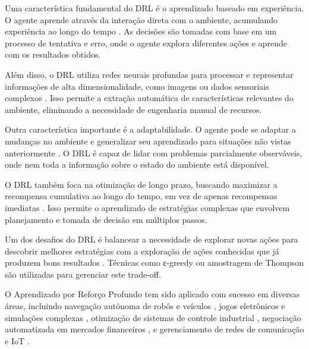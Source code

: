 Uma característica fundamental do DRL é o aprendizado baseado em experiência. O agente aprende através da interação direta com o ambiente, acumulando experiência ao longo do tempo \cite{https://www.semanticscholar.org/paper/8efe27f4a31ebb72e9b3047107a4fe940259aad9}. As decisões são tomadas com base em um processo de tentativa e erro, onde o agente explora diferentes ações e aprende com os resultados obtidos.

Além disso, o DRL utiliza redes neurais profundas para processar e representar informações de alta dimensionalidade, como imagens ou dados sensoriais complexos \cite{https://www.semanticscholar.org/paper/8efe27f4a31ebb72e9b3047107a4fe940259aad9,https://www.semanticscholar.org/paper/3340124e85d6e5fbc08db49ad3e6a8d9ffa04222}. Isso permite a extração automática de características relevantes do ambiente, eliminando a necessidade de engenharia manual de recursos.

Outra característica importante é a adaptabilidade. O agente pode se adaptar a mudanças no ambiente e generalizar seu aprendizado para situações não vistas anteriormente \cite{https://www.semanticscholar.org/paper/27c834620d2c6adb51dffc4be9907e185907ce12}. O DRL é capaz de lidar com problemas parcialmente observáveis, onde nem toda a informação sobre o estado do ambiente está disponível.

O DRL também foca na otimização de longo prazo, buscando maximizar a recompensa cumulativa ao longo do tempo, em vez de apenas recompensas imediatas \cite{https://www.semanticscholar.org/paper/45ae19e1e9037e10e90423b536eb183dcd99bd2e}. Isso permite o aprendizado de estratégias complexas que envolvem planejamento e tomada de decisão em múltiplos passos.

Um dos desafios do DRL é balancear a necessidade de explorar novas ações para descobrir melhores estratégias com a exploração de ações conhecidas que já produzem bons resultados \cite{https://www.semanticscholar.org/paper/fef82649815694167ef56929648a51f2eb0849e9}. Técnicas como ε-greedy ou amostragem de Thompson são utilizadas para gerenciar este trade-off.

O Aprendizado por Reforço Profundo tem sido aplicado com sucesso em diversas áreas, incluindo navegação autônoma de robôs e veículos \cite{https://www.semanticscholar.org/paper/3340124e85d6e5fbc08db49ad3e6a8d9ffa04222,https://www.semanticscholar.org/paper/fef82649815694167ef56929648a51f2eb0849e9}, jogos eletrônicos e simulações complexas \cite{https://www.semanticscholar.org/paper/3879ab51e5eea7ce06dc31edbb169afb76e0bd71}, otimização de sistemas de controle industrial \cite{https://www.semanticscholar.org/paper/27c834620d2c6adb51dffc4be9907e185907ce12}, negociação automatizada em mercados financeiros \cite{https://www.semanticscholar.org/paper/45ae19e1e9037e10e90423b536eb183dcd99bd2e}, e gerenciamento de redes de comunicação e IoT \cite{https://www.semanticscholar.org/paper/3879ab51e5eea7ce06dc31edbb169afb76e0bd71,https://www.semanticscholar.org/paper/668a75bdb9c3f6d088f7da2b4b76ec1e66c484b8}.

